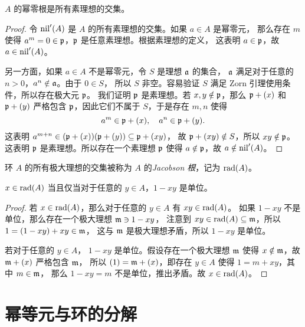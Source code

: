 \begin{proposition}
  $A$ 的幂零根是所有素理想的交集。
\end{proposition}
\begin{proof}
  令 $\operatorname{nil}'(A)$ 是 $A$ 的所有素理想的交集。如果 $a\in A$ 是幂零元，
  那么存在 $m$ 使得 $a^m=0\in\mathfrak{p}$，$\mathfrak{p}$ 是任意素理想。根据素理想的定义，
  这表明 $a\in\mathfrak{p}$，故 $a\in\operatorname{nil}'(A)$。

  另一方面，如果 $a\in A$ 不是幂零元，令 $S$ 是理想 $\mathfrak{a}$ 的集合，
  $\mathfrak{a}$ 满足对于任意的 $n>0$，$a^n\notin\mathfrak{a}$。由于 $0\in S$，
  所以 $S$ 非空。容易验证 $S$ 满足 Zorn 引理使用条件，所以存在极大元 $\mathfrak{p}$。
  我们证明 $\mathfrak{p}$ 是素理想。若 $x,y\notin\mathfrak{p}$，那么
  $\mathfrak{p}+(x)$ 和 $\mathfrak{p}+(y)$ 严格包含 $\mathfrak{p}$，因此它们不属于
  $S$，于是存在 $m,n$ 使得
  \[
    a^m\in\mathfrak{p}+(x),\quad a^n\in\mathfrak{p}+(y).
  \]
  这表明 $a^{m+n}\in (\mathfrak{p}+(x))(\mathfrak{p}+(y))\subseteq \mathfrak{p}+(xy)$，
  故 $\mathfrak{p}+(xy)\notin S$，所以 $xy\notin\mathfrak{p}$。这表明 $\mathfrak{p}$
  是素理想。所以存在一个素理想 $\mathfrak{p}$ 使得 $a\notin\mathfrak{p}$，故
  $a\notin\operatorname{nil}'(A)$。
\end{proof}

\begin{definition}
  环 $A$ 的所有极大理想的交集被称为 $A$ 的\emph{Jacobson 根}，记为 $\operatorname{rad}(A)$。
\end{definition}

\begin{proposition}\label{prop:Jacobson radical}
  $x\in \operatorname{rad}(A)$ 当且仅当对于任意的 $y\in A$，$1-xy$ 是单位。
\end{proposition}
\begin{proof}
  若 $x\in \operatorname{rad}(A)$，那么对于任意的 $y\in A$ 有 $xy\in \operatorname{rad}(A)$。 
  如果 $1-xy$ 不是单位，那么存在一个极大理想 $\mathfrak{m}\ni 1-xy$，
  注意到 $xy\in \operatorname{rad}(A)\subseteq \mathfrak{m}$，所以 $1=(1-xy)+xy\in \mathfrak{m}$，
  这与 $\mathfrak{m}$ 是极大理想矛盾，所以 $1-xy$ 是单位。

  若对于任意的 $y\in A$， $1-xy$ 是单位。假设存在一个极大理想 $\mathfrak{m}$
  使得 $x\notin\mathfrak{m}$，故 $\mathfrak{m}+(x)$ 严格包含 $\mathfrak{m}$，
  所以 $(1)=\mathfrak{m}+(x)$，即存在 $y\in A$ 使得 $1=m+xy$，其中 $m\in\mathfrak{m}$，
  那么 $1-xy=m$ 不是单位，推出矛盾。故 $x\in \operatorname{rad}(A)$。
\end{proof}

\section{幂等元与环的分解}

